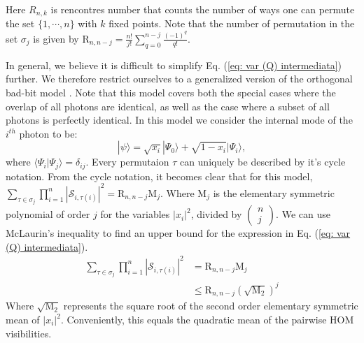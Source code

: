 \documentclass[10pt,aps,pra,twocolumn,superscriptaddress]{revtex4-2}
\begin{document}
Here $R_{n,k}$ is rencontres number that counts the number of ways one can permute the set $\{1,\cdots, n\}$ with $k$ fixed points. Note that the number of permutation in the set $\sigma_{j}$ is given by $\mathrm{R}_{n,n-j}=\frac{n!}{j!}\sum_{q=0}^{n-j}\frac{(-1)^q}{q!}$. 

In general, we believe it is difficult to simplify Eq. (\ref{eq: var (Q) intermediata}) further. We therefore restrict ourselves to a generalized version of the orthogonal bad-bit model \cite{sparrow2018phd_thesis,marshall2022distillation}. Note that this model covers both the special cases where the overlap of all photons are identical, as well as the case where a subset of all photons is perfectly identical. In this model we consider the internal mode of the $i^{th}$ photon to be:
\begin{equation}
    |\psi\rangle = \sqrt{x_i}|\Psi_0\rangle + \sqrt{1-x_i}|\Psi_i\rangle,
    \label{eq: iid obb}
\end{equation}
where $\langle\Psi_i|\Psi_j\rangle=\delta_{ij}$. Every permutaion $\tau$ can uniquely be described by it's cycle notation. From the cycle notation, it becomes clear that for this model, $\sum_{\tau\in\sigma_j}\prod^n_{i=1}|\mathcal{S}_{i,\tau(i)}|^2=\mathrm{R}_{n,n-j} \mathrm{M}_j$. Where $\mathrm{M}_j$ is the elementary symmetric polynomial of order $j$ for the variables $|x_i|^2$, divided by $\begin{pmatrix}n\\j\end{pmatrix}$. We can use McLaurin's inequality to find an upper bound for the expression in Eq. (\ref{eq: var (Q) intermediata}).
\begin{equation}
\begin{split}
    \sum_{\tau\in\sigma_j}\prod^n_{i=1}|\mathcal{S}_{i,\tau(i)}|^2&=\mathrm{R}_{n,n-j} \mathrm{M}_j\\
    &\leq \mathrm{R}_{n,n-j} \left(\sqrt{\mathrm{M}_2}\right)^j
    \end{split}
    \label{eq: mclaurin's inequality}
\end{equation}
Where $\sqrt{\mathrm{M}_2}$ represents the square root of the second order elementary symmetric mean of $|x_i|^2$. Conveniently, this equals the quadratic mean of the pairwise HOM visibilities.
\end{document}
